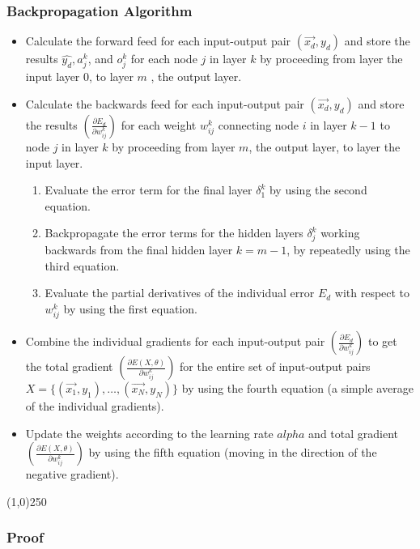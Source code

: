 \documentclass[journal]{IEEEtran}
\begin{document}
\subsubsection{Backpropagation Algorithm}
\begin{itemize}
    \item Calculate the forward feed for each input-output pair $(\vec{x_d},y_d)$ and store the results $\hat{y_d},a_j^k$, and $o_j^k$ for each node $j$ in layer $k$ by proceeding from layer the input layer $0$, to layer $m$ , the output layer.
    \item Calculate the backwards feed for each input-output pair $(\vec{x_d},y_d)$ and store the results $(\frac{\partial E_d}{\partial w_{ij}^k})$ for each weight $w_{ij}^k$ connecting node $i$ in layer $k - 1$ to node $j$ in layer $k$ by proceeding from layer $m$, the output layer, to layer  the input layer.
    \begin{enumerate}
     \item Evaluate the error term for the final layer $\delta_1^k$ by using the second equation.
     \item Backpropagate the error terms for the hidden layers $\delta_j^k$ working backwards from the final hidden layer $k = m - 1$, by repeatedly using the third equation.
     \item Evaluate the partial derivatives of the individual error $E_d$ with respect to $w_{ij}^k$ by using the first equation.
    \end{enumerate}
    \item Combine the individual gradients for each input-output pair $(\frac{\partial E_d}{\partial w_{ij}^k})$ to get the total gradient $(\frac{\partial E(X, \theta)}{\partial w_{ij}^k})$ for the entire set of input-output pairs 
    $X = \{(\vec{x_1}, y_1), \dots, (\vec{x_N}, y_N) \}$ by using the fourth equation (a simple average of the individual gradients).
    \item Update the weights according to the learning rate $alpha$ and total gradient $(\frac{\partial E(X, \theta)}{\partial w_{ij}^k})$ by using the fifth equation (moving in the direction of the negative gradient).
\end{itemize}

\begin{center}
\line(1,0){250}
\end{center}
\subsubsection{Proof}
\end{document}
